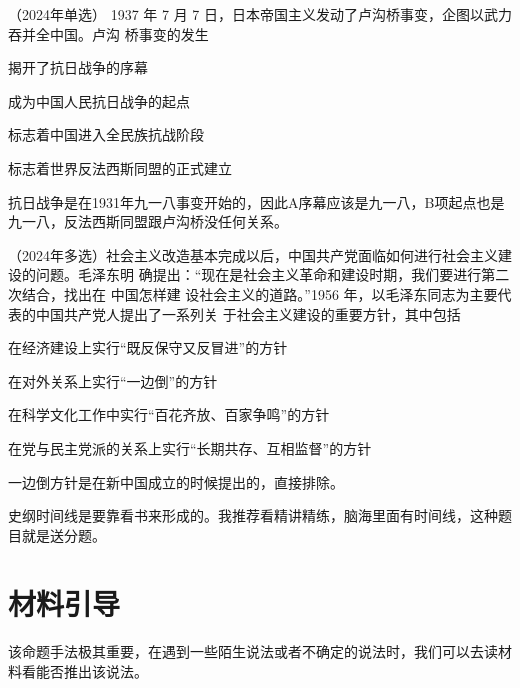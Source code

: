 \documentclass[lang=cn,blue,10pt,scheme=chinese,twocol]{zznote}
\begin{document}
\begin{example} （2024年单选）	1937 年 7 月 7 日，日本帝国主义发动了卢沟桥事变，企图以武力吞并全中国。卢沟 桥事变的发生
	\begin{choice}
		\item 揭开了抗日战争的序幕
		\item 成为中国人民抗日战争的起点
		\item 标志着中国进入全民族抗战阶段
		\item 标志着世界反法西斯同盟的正式建立
	\end{choice}
\end{example}
\begin{solution}
	抗日战争是在1931年九一八事变开始的，因此A序幕应该是九一八，B项起点也是九一八，反法西斯同盟跟卢沟桥没任何关系。
\end{solution}

\begin{example} （2024年多选）社会主义改造基本完成以后，中国共产党面临如何进行社会主义建设的问题。毛泽东明 确提出：“现在是社会主义革命和建设时期，我们要进行第二次结合，找出在 中国怎样建 设社会主义的道路。”1956 年，以毛泽东同志为主要代表的中国共产党人提出了一系列关 于社会主义建设的重要方针，其中包括
	\begin{choice}
		\item 在经济建设上实行“既反保守又反冒进”的方针
		\item 在对外关系上实行“一边倒”的方针
		\item 在科学文化工作中实行“百花齐放、百家争鸣”的方针
		\item 在党与民主党派的关系上实行“长期共存、互相监督”的方针
	\end{choice}
\end{example}
\begin{solution}
	一边倒方针是在新中国成立的时候提出的，直接排除。
\end{solution}

\begin{postulate}
	史纲时间线是要靠看书来形成的。我推荐看精讲精练，脑海里面有时间线，这种题目就是送分题。
\end{postulate}
\section{材料引导}
\begin{definition}
	该命题手法极其重要，在遇到一些陌生说法或者不确定的说法时，我们可以去读材料看能否推出该说法。
\end{definition}
\end{document}
